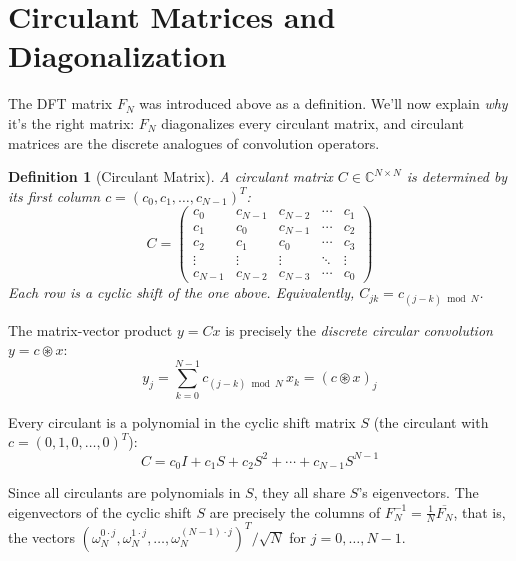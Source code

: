 \documentclass[12pt,a4paper]{report}
\theoremstyle{thms}
\theoremstyle{defns}
\newtheorem{definition}{Definition}[section]
\begin{document}
\section{Circulant Matrices and Diagonalization}
\label{sec:circulant}

The DFT matrix $F_N$ was introduced above as a definition. We'll now explain \textit{why} it's the right matrix: $F_N$ diagonalizes every circulant matrix, and circulant matrices are the discrete analogues of convolution operators.

\begin{definition}[Circulant Matrix]
    A circulant matrix $C \in \mathbb{C}^{N \times N}$ is determined by its first column $c = (c_0, c_1, \ldots, c_{N-1})^T$:
    \begin{equation}
        C = \begin{pmatrix}
            c_0     & c_{N-1} & c_{N-2} & \cdots & c_1     \\
            c_1     & c_0     & c_{N-1} & \cdots & c_2     \\
            c_2     & c_1     & c_0     & \cdots & c_3     \\
            \vdots  & \vdots  & \vdots  & \ddots & \vdots  \\
            c_{N-1} & c_{N-2} & c_{N-3} & \cdots & c_0
        \end{pmatrix}
    \end{equation}
    Each row is a cyclic shift of the one above. Equivalently, $C_{jk} = c_{(j-k) \bmod N}$.
\end{definition}

The matrix-vector product $y = Cx$ is precisely the \textit{discrete circular convolution} $y = c \circledast x$:
\begin{equation}
    y_j = \sum_{k=0}^{N-1} c_{(j-k) \bmod N}\, x_k = (c \circledast x)_j
\end{equation}

Every circulant is a polynomial in the cyclic shift matrix $S$ (the circulant with $c = (0, 1, 0, \ldots, 0)^T$):
\begin{equation}
    C = c_0 I + c_1 S + c_2 S^2 + \cdots + c_{N-1} S^{N-1}
\end{equation}

Since all circulants are polynomials in $S$, they all share $S$'s eigenvectors. The eigenvectors of the cyclic shift $S$ are precisely the columns of $F_N^{-1} = \frac{1}{N}\overline{F_N}$, that is, the vectors $(\omega_N^{0 \cdot j}, \omega_N^{1 \cdot j}, \ldots, \omega_N^{(N-1)\cdot j})^T / \sqrt{N}$ for $j = 0, \ldots, N - 1$.
\end{document}
